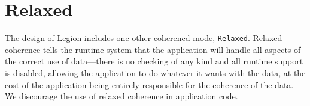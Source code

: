 \section{Relaxed}
\label{sec:relaxed}

The design of Legion includes one other coherencd mode, {\tt Relaxed}.
Relaxed coherence tells the runtime system that the application will
handle all aspects of the correct use of data---there is no checking
of any kind and all runtime support is disabled, allowing the
application to do whatever it wants with the data, at the cost of the
application being entirely responsible for the coherence of the data.
We discourage the use of relaxed coherence in application code.


